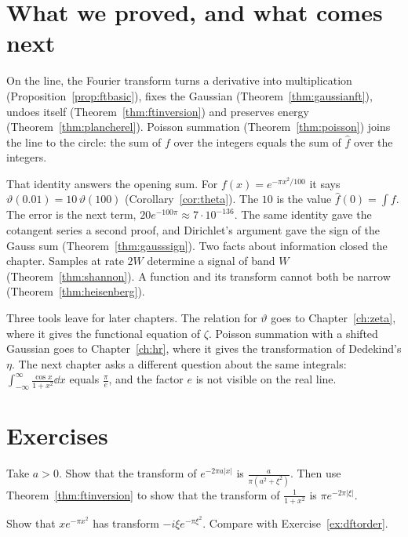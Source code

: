 \section{What we proved, and what comes next}

On the line, the Fourier transform turns a derivative into multiplication (Proposition~\ref{prop:ftbasic}), fixes the Gaussian (Theorem~\ref{thm:gaussianft}), undoes itself (Theorem~\ref{thm:ftinversion}) and preserves energy (Theorem~\ref{thm:plancherel}). Poisson summation (Theorem~\ref{thm:poisson}) joins the line to the circle: the sum of $f$ over the integers equals the sum of $\hat f$ over the integers.

That identity answers the opening sum. For $f(x)=e^{-\pi x^2/100}$ it says $\vartheta(0.01)=10\,\vartheta(100)$ (Corollary~\ref{cor:theta}). The $10$ is the value $\hat f(0)=\int f$. The error is the next term, $20e^{-100\pi}\approx7\cdot10^{-136}$. The same identity gave the cotangent series a second proof, and Dirichlet's argument gave the sign of the Gauss sum (Theorem~\ref{thm:gausssign}). Two facts about information closed the chapter. Samples at rate $2W$ determine a signal of band $W$ (Theorem~\ref{thm:shannon}). A function and its transform cannot both be narrow (Theorem~\ref{thm:heisenberg}).

Three tools leave for later chapters. The relation for $\vartheta$ goes to Chapter~\ref{ch:zeta}, where it gives the functional equation of $\zeta$. Poisson summation with a shifted Gaussian goes to Chapter~\ref{ch:hr}, where it gives the transformation of Dedekind's $\eta$. The next chapter asks a different question about the same integrals: $\int_{-\infty}^{\infty}\frac{\cos x}{1+x^2}\dd x$ equals $\frac\pi e$, and the factor $e$ is not visible on the real line.

\section{Exercises}

\begin{exercise}[$\star$]\label{ex:lorentz}
Take $a>0$. Show that the transform of $e^{-2\pi a|x|}$ is $\frac a{\pi(a^2+\xi^2)}$. Then use Theorem~\ref{thm:ftinversion} to show that the transform of $\frac1{1+x^2}$ is $\pi e^{-2\pi|\xi|}$.
\end{exercise}

\begin{exercise}[$\star$]\label{ex:hermite}
Show that $xe^{-\pi x^2}$ has transform $-i\xi e^{-\pi\xi^2}$. Compare with Exercise~\ref{ex:dftorder}.
\end{exercise}

